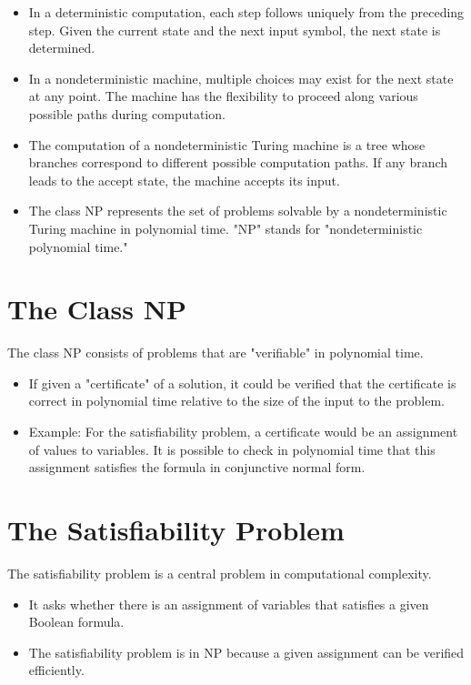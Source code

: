 \documentclass[12pt,openany]{book}
\theoremstyle{definition}
\begin{document}
\begin{itemize}
	\item In a deterministic computation, each step follows uniquely from the preceding step. Given the current state and the next input symbol, the next state is determined.
	\item In a nondeterministic machine, multiple choices may exist for the next state at any point. The machine has the flexibility to proceed along various possible paths during computation.
	\item The computation of a nondeterministic Turing machine is a tree whose branches correspond to different possible computation paths. If any branch leads to the accept state, the machine accepts its input.
	\item The class NP represents the set of problems solvable by a nondeterministic Turing machine in polynomial time. "NP" stands for "nondeterministic polynomial time."
\end{itemize}

\section{The Class NP}
The class NP consists of problems that are "verifiable" in polynomial time.

\begin{itemize}
	\item If given a "certificate" of a solution, it could be verified that the certificate is correct in polynomial time relative to the size of the input to the problem.
	\item Example: For the satisfiability problem, a certificate would be an assignment of values to variables. It is possible to check in polynomial time that this assignment satisfies the formula in conjunctive normal form.
\end{itemize}

\section{The Satisfiability Problem}
The satisfiability problem is a central problem in computational complexity.

\begin{itemize}
	\item It asks whether there is an assignment of variables that satisfies a given Boolean formula.
	\item The satisfiability problem is in NP because a given assignment can be verified efficiently.
\end{itemize}
\end{document}
